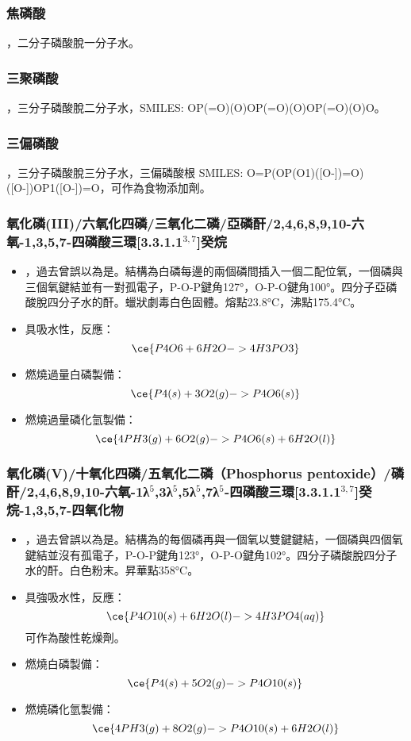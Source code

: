\documentclass[a4paper,12pt]{report}
\begin{document}
\subsubsection{焦磷酸}
，二分子磷酸脫一分子水。
\subsubsection{三聚磷酸}
，三分子磷酸脫二分子水，SMILES: OP(=O)(O)OP(=O)(O)OP(=O)(O)O。
\subsubsection{三偏磷酸}
，三分子磷酸脫三分子水，三偏磷酸根 SMILES: O=P(OP(O1)([O-])=O)([O-])OP1([O-])=O，可作為食物添加劑。
\subsubsection{氧化磷(III)/六氧化四磷/三氧化二磷/亞磷酐/2,4,6,8,9,10-六氧-1,3,5,7-四磷酸三環[3.3.1.1$^{3,7}$]癸烷}
\begin{itemize}
\item {}，過去曾誤以為是。結構為白磷每邊的兩個磷間插入一個二配位氧，一個磷與三個氧鍵結並有一對孤電子，P-O-P鍵角127°，O-P-O鍵角100°。四分子亞磷酸脫四分子水的酐。蠟狀劇毒白色固體。熔點23.8°C，沸點175.4°C。
\item 具吸水性，反應：
\[\ce{P4O6 + 6H2O -> 4H3PO3}\]
\item 燃燒過量白磷製備：
\[\ce{P4(s) + 3O2(g) -> P4O6(s)}\]
\item 燃燒過量磷化氫製備：
\[\ce{4PH3(g) + 6O2(g) -> P4O6(s) + 6H2O(l)}\]
\end{itemize}
\subsubsection{氧化磷(V)/十氧化四磷/五氧化二磷（Phosphorus pentoxide）/磷酐/2,4,6,8,9,10-六氧-1λ$^5$,3λ$^5$,5λ$^5$,7λ$^5$-四磷酸三環[3.3.1.1$^{3,7}$]癸烷-1,3,5,7-四氧化物}
\begin{itemize}
\item {}，過去曾誤以為是。結構為的每個磷再與一個氧以雙鍵鍵結，一個磷與四個氧鍵結並沒有孤電子，P-O-P鍵角123°，O-P-O鍵角102°。四分子磷酸脫四分子水的酐。白色粉末。昇華點358°C。
\item 具強吸水性，反應：
\[\ce{P4O10(s) + 6H2O(l) -> 4H3PO4(aq)}\]
可作為酸性乾燥劑。
\item 燃燒白磷製備：
\[\ce{P4(s) + 5O2(g) -> P4O10(s)}\]
\item 燃燒磷化氫製備：
\[\ce{4PH3(g) + 8O2(g) -> P4O10(s) + 6H2O(l)}\]
\end{itemize}
\end{document}
